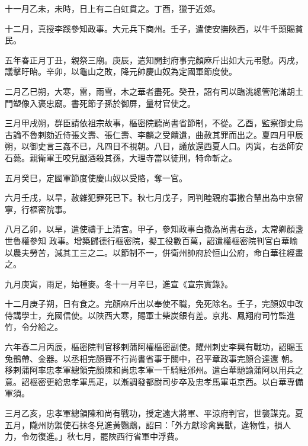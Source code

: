 \begin{pinyinscope}
 十一月乙未，未時，日上有二白虹貫之。丁酉，獵于近郊。



 十二月，真授李蹊參知政事。大元兵下商州。壬子，遣使安撫陜西，以牛千頭賜貧民。



 五年春正月丁丑，親祭三廟。庚辰，遣知開封府事完顏麻斤出如大元弔慰。丙戌，議擊盱眙。辛卯，以龜山之敗，降元帥慶山奴為定國軍節度使。



 二月乙巳朔，大寒，雷，雨雪，木之華者盡死。癸丑，詔有司以臨洮總管陀滿胡土門塑像入褒忠廟。書死節子孫於御屏，量材官使之。



 三月甲戌朔，群臣請依祖宗故事，樞密院聽尚書省節制，不從。乙酉，監察御史烏古論不魯剌劾近侍張文壽、張仁壽、李麟之受饋遺，曲赦其罪而出之。夏四月甲辰朔，以御史言三姦不已，凡四日不視朝。八日，議放還西夏人口。丙寅，右丞師安石薨。親衛軍王咬兒酗酒殺其孫，大理寺當以徒刑，特命斬之。



 五月癸巳，定國軍節度使慶山奴以受賂，奪一官。



 六月壬戌，以旱，赦雜犯罪死已下。秋七月戊子，同判睦親府事撒合輦出為中京留寧，行樞密院事。



 八月乙卯，以旱，遣使禱于上清宮。甲子，參知政事白撒為尚書右丞，太常卿顏盞世魯權參知
 政事。增築歸德行樞密院，擬工役數百萬，詔遣權樞密院判官白華喻以農夫勞苦，減其工三之二。以節制不一，併衛州帥府於恒山公府，命白華往經畫之。



 九月庚寅，雨足，始種麥。冬十一月辛巳，進宣《宣宗實錄》。



 十二月庚子朔，日有食之。完顏麻斤出以奉使不職，免死除名。壬子，完顏奴申改侍講學士，充國信使。以陜西大寒，賜軍士柴炭銀有差。京兆、鳳翔府司竹監進竹，令分給之。



 六年春二月丙辰，樞密院判官移剌蒲阿權樞密副使。耀州刺史李興有戰功，詔賜玉兔鶻帶、金器。以丞相完顏賽不行尚書省事于關中，召平章政事完顏合達還
 朝。移剌蒲阿率忠孝軍總領完顏陳和尚忠孝軍一千騎駐邠州。遣白華馳諭蒲阿以用兵之意。詔樞密更給忠孝軍馬疋，以漸調發都尉司步卒及忠孝馬軍屯京西。以白華專備軍須。



 三月乙亥，忠孝軍總領陳和尚有戰功，授定遠大將軍、平涼府判官，世襲謀克。夏五月，隴州防禦使石抹冬兒進黃鸚鵡，詔曰：「外方獻珍禽異獸，違物性，損人力，令勿復進。」秋七月，罷陜西行省軍中浮費。




\end{pinyinscope}
